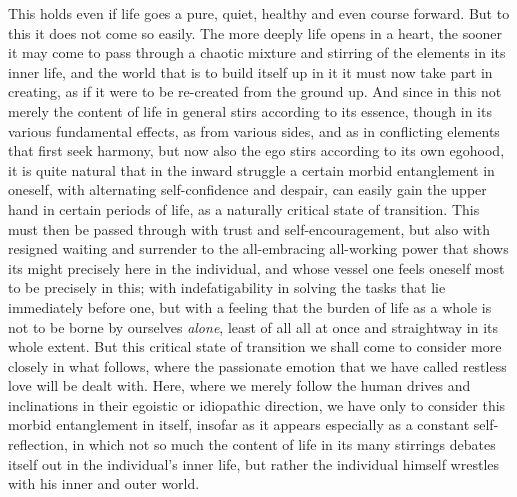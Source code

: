 \documentclass[12pt,a4paper,openany]{book}
\newcommand{\opage}[1]{\marginnote{\footnotesize\textit{[#1]}}}
\begin{document}
This holds even if life goes a pure, quiet, healthy and even course forward. But to
this it does not come so easily. The more deeply life opens in a heart, the sooner
it may come to pass through a chaotic mixture and stirring of the elements in its
inner life, and the world that is to build itself up in it it must now take part in
creating, as if it were to be re-created from the ground up. And since in this not
merely the content of life in general stirs according to its essence, though in its
various fundamental effects, as from various sides, and as
\setcounter{footnote}{0}%
\opage{117}in conflicting elements that first seek harmony, but now also the ego stirs
according to its own egohood, it is quite natural that in the inward struggle a
certain morbid entanglement in oneself, with alternating self-confidence and
despair, can easily gain the upper hand in certain periods of life, as a naturally
critical state of transition. This must then be passed through with trust and
self-encouragement, but also with resigned waiting and surrender to the
all-embracing all-working power that shows its might precisely here in the
individual, and whose vessel one feels oneself most to be precisely in this; with
indefatigability in solving the tasks that lie immediately before one, but with a
feeling that the burden of life as a whole is not to be borne by ourselves
\emph{alone}, least of all all at once and straightway in its whole extent. But this
critical state of transition we shall come to consider more closely in what
follows, where the passionate emotion that we have called restless love will be
dealt with. Here, where we merely follow the human drives and inclinations in their
egoistic or idiopathic direction, we have only to consider this morbid entanglement
in itself, insofar as it appears especially as a constant self-reflection, in which
not so much the content of life in its many stirrings debates itself out in the
individual's inner life, but rather the individual himself wrestles with his inner
and outer world.
\end{document}

